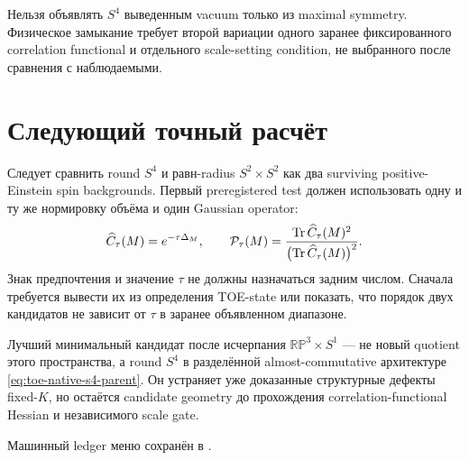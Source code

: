 \begin{nogocriterion}
Нельзя объявлять \(S^4\) выведенным vacuum только из maximal symmetry.
Физическое замыкание требует второй вариации одного заранее фиксированного
correlation functional и отдельного scale-setting condition, не выбранного
после сравнения с наблюдаемыми.
\end{nogocriterion}

\section{Следующий точный расчёт}

Следует сравнить round \(S^4\) и равн-radius \(S^2\times S^2\) как два
surviving positive-Einstein spin backgrounds. Первый preregistered test
должен использовать одну и ту же нормировку объёма и один Gaussian operator:
\begin{equation}
 \widehat C_\tau(M)=e^{-\tau\Delta_M},
 \qquad
 \mathcal P_\tau(M)=
 \frac{\operatorname{Tr}\widehat C_\tau(M)^2}
      {\bigl(\operatorname{Tr}\widehat C_\tau(M)\bigr)^2}.
 \label{eq:carrier-correlation-purity}
\end{equation}
Знак предпочтения и значение \(\tau\) не должны назначаться задним числом.
Сначала требуется вывести их из определения TOE-state или показать, что
порядок двух кандидатов не зависит от \(\tau\) в заранее объявленном
диапазоне.

\begin{theorem}
Лучший минимальный кандидат после исчерпания
\(\mathbb{RP}^3\times S^1\) --- не новый quotient этого пространства, а
round \(S^4\) в разделённой almost-commutative архитектуре
\eqref{eq:toe-native-s4-parent}. Он устраняет уже доказанные структурные
дефекты fixed-\(K\), но остаётся candidate geometry до прохождения
correlation-functional Hessian и независимого scale gate.
\end{theorem}

Машинный ledger меню сохранён в
.